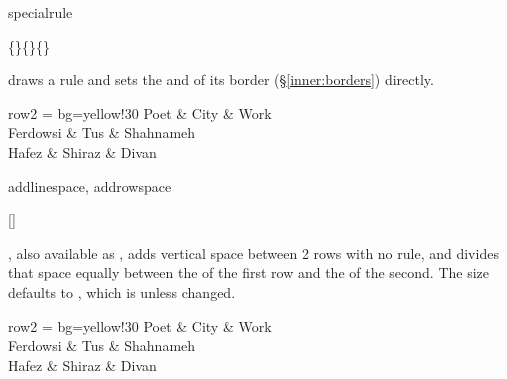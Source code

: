 \begin{codedescribe}[
        code,
        new=2021N
    ]{specialrule}
    \begin{codesyntax}
        \{\}\{\}\{\}
    \end{codesyntax}
     draws a rule and sets the  and  of its border (\S\ref{inner:borders}) directly.

    \begin{codestore}[st=lib:booktabs:special]
        \begin{booktabs}{row{2} = {bg=yellow!30}}
            \toprule
            Poet     & City   & Work      \\
            \specialrule{0.5pt}{4pt}{6pt}
            Ferdowsi & Tus    & Shahnameh \\
            Hafez    & Shiraz & Divan     \\
            \bottomrule
        \end{booktabs}\end{codestore}
    \begin{center}
    \end{center}
\end{codedescribe}

\begin{codedescribe}[
        code,
        new=2021N
    ]{addlinespace, addrowspace}
    \begin{codesyntax}
        []
    \end{codesyntax}
    , also available as , adds vertical space between 2 rows with no rule, and divides that space equally between the  of the first row and the  of the second. The size defaults to , which is \val{.5em} unless changed.

    \begin{codestore}[st=lib:booktabs:space]
        \begin{booktabs}{row{2} = {bg=yellow!30}}
            \toprule
            Poet     & City   & Work      \\
            \addlinespace
            Ferdowsi & Tus    & Shahnameh \\
            \addlinespace[1em]
            Hafez    & Shiraz & Divan     \\
            \bottomrule
        \end{booktabs}\end{codestore}
    \begin{center}
    \end{center}
\end{codedescribe}

